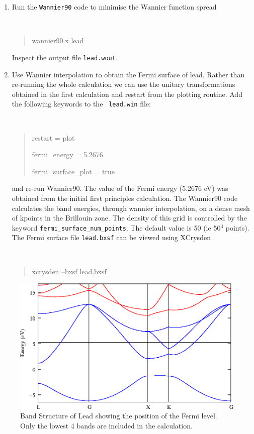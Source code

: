 \documentclass[a4paper,11pt,twoside]{article}
\begin{document}
\begin{enumerate}
\item Run the {\tt Wannier90} code to minimise the Wannier function spread
{\tt
\begin{quote}
wannier90.x lead
\end{quote} }
Inspect the output file {\tt lead.wout}.
\item Use Wannier interpolation to obtain the Fermi surface of
  lead. Rather than re-running the whole calculation we can use the
  unitary transformations obtained in the first calculation and restart
  from the plotting routine. Add the following keywords to the {\tt
    lead.win} file: 
{\tt
\begin{quote}
restart = plot

fermi\_energy = 5.2676

fermi\_surface\_plot = true
\end{quote} }
and re-run Wannier90. The value of the Fermi energy (5.2676 eV) was
obtained from the initial first principles calculation. The Wannier90
code calculates the band energies, through wannier interpolation, on a
dense mesh of kpoints in the Brillouin zone. The density of this grid is
controlled by the keyword {\tt fermi\_surface\_num\_points}. The default
value is 50 (ie 50$^3$ points). 
The Fermi surface file {\tt lead.bxsf} can be viewed using XCrysden
{\tt
\begin{quote}
xcrysden --bxsf lead.bxsf
\end{quote} }
\end{enumerate}

\begin{figure}[h]
\begin{center}
\includegraphics{lead.eps}
\caption{Band Structure of Lead showing the position of the Fermi
  level. Only the lowest 4 bands are included in the calculation.} 
\label{fig:pb-bnd}
\end{center}
\end{figure}
\end{document}
